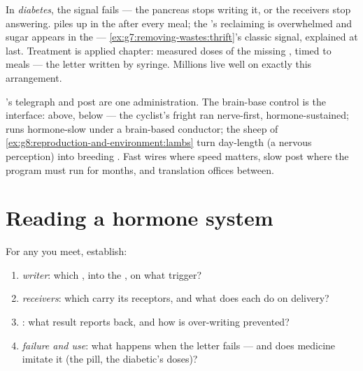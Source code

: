 \begin{example}\label{ex:g8:hormonal-communication:diabetes}
In \emph{diabetes}, the 
signal fails --- the pancreas stops writing it, or the
receivers stop answering.  piles up in the 
after every meal; the 's reclaiming is overwhelmed
and sugar appears in the  ---
\cref{ex:g7:removing-wastes:thrift}'s classic signal,
explained at last. Treatment is applied chapter: measured
doses of the missing , timed to meals --- the
letter written by syringe. Millions live well on exactly
this arrangement.
\end{example}

\begin{remark}\label{rem:g8:hormonal-communication:partnership}
's telegraph
and post are one administration. The brain-base control
 is the interface:  above, 
below --- the cyclist's fright ran nerve-first,
hormone-sustained;  runs hormone-slow under a
brain-based conductor; the sheep of
\cref{ex:g8:reproduction-and-environment:lambs} turn
day-length (a nervous perception) into breeding .
Fast wires where speed matters, slow post where the
program must run for months, and translation offices
between.
\end{remark}

\section{Reading a hormone system}

\begin{method}\label{met:g8:hormonal-communication:read}
For any  you meet, establish:
\begin{enumerate}
  \item \emph{writer}: which , into the , on
        what trigger?
  \item \emph{receivers}: which  carry its
        receptors, and what does each do on delivery?
  \item \emph{}: what result reports back, and
        how is over-writing prevented?
  \item \emph{failure and use}: what happens when the
        letter fails --- and does medicine imitate it
        (the pill, the diabetic's doses)?
\end{enumerate}
\end{method}

